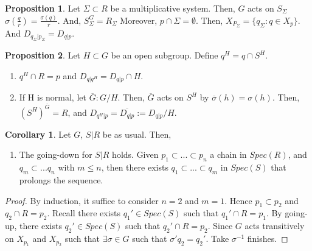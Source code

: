 \documentclass{article}
\theoremstyle{definition}
\theoremstyle{definition}
\theoremstyle{definition}
\newtheorem{proposition}{Proposition}[section]
\theoremstyle{definition}
\theoremstyle{definition}
\theoremstyle{definition}
\newtheorem{corollary}{Corollary}[theorem]
\theoremstyle{definition}
\begin{document}
\begin{tcolorbox}[colback=blue!5!white,colframe=blue!30!white]
\begin{proposition}
Let $\Sigma\subset R$ be a multiplicative system. Then, $G$ acts on $S_{\Sigma}$ $\sigma(\frac{q}{r})=\frac{\sigma(q)}{r}$. And, $S^G_{\Sigma}=R_{\Sigma}$ Moreover, $p\cap \Sigma=\emptyset$. Then, $X_{P_{\Sigma}}=\{ q_{\Sigma}: q\in X_p \}$. And $D_{q_{\Sigma}|p_{\Sigma}}=D_{q|p}$. 

\end{proposition}
\end{tcolorbox}


\begin{tcolorbox}[colback=blue!5!white,colframe=blue!30!white]
\begin{proposition}
Let $H\subset G$ be an open subgroup. Define $q^H=q\cap S^H$. 

\begin{enumerate}
    \item  $q^H\cap R=p$ and  $D_{q|q^H}=D_{q|p}\cap H$.
    \item If H is normal, let $\overline{G}: G/H$. Then, $\overline{G}$ acts on $S^H$ by $\overline{\sigma}(h)=\sigma(h)$.  Then, $(S^H)^{\overline{G}}=R$, and $D_{q^H|p}=\overline{D_{q|p}}:=D_{q|p}/H$.
\end{enumerate}
\end{proposition}
\end{tcolorbox}



\begin{tcolorbox}[colback=green!5!white,colframe=green!30!white]
\begin{corollary}
Let $G$, $S|R$ be as usual. Then,
\begin{enumerate}
    \item The going-down for $S|R$ holds. Given $p_1\subset ...\subset p_n$ a chain in $Spec(R)$, and $q_m\subset ...q_n$ with $m\leq n$, then there exists $q_1\subset ... \subset q_m$ in $Spec(S)$ that prolongs the sequence. 
\end{enumerate}
\end{corollary}
\end{tcolorbox}
\begin{proof}
    By induction, it suffice to consider $n=2$ and $m=1$. Hence $p_1\subset p_2$ and $q_2\cap R=p_2$. Recall there exists $q_1'\in Spec(S)$ such that $q_1'\cap R=p_1$. By going-up, there exists $q_2'\in Spec(S)$ such that $q_2'\cap R=p_2$. Since $G$ acts transitively  on $X_{p_1}$ and $X_{p_2}$ such that $\exists \sigma\in G$ such that $\sigma'q_2=q_2'$. Take $\sigma ^{-1}$ finishes. 
\end{proof}
\end{document}
